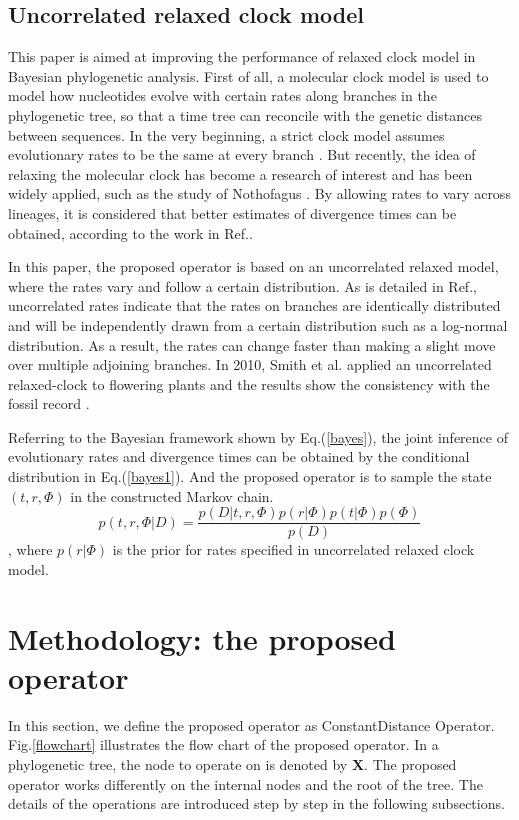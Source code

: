 \documentclass{bmcart}
\begin{document}
\subsection*{Uncorrelated relaxed clock model}
This paper is aimed at improving the performance of relaxed clock model in Bayesian phylogenetic analysis. First of all, a molecular clock model is used to model how nucleotides evolve with certain rates along branches in the phylogenetic tree, so that a time tree can reconcile with the genetic distances between sequences. In the very beginning, a strict clock model assumes evolutionary rates to be the same at every branch \cite{zuckerkandl1965evolutionary}. But recently, the idea of relaxing the molecular clock has become a research of interest and has been widely applied, such as the study of Nothofagus \cite{knapp2005relaxed}. By allowing rates to vary across lineages, it is considered that better estimates of divergence times can be obtained, according to the work in Ref.\cite{ho2005accuracy,renner2005relaxed,lepage2007general}. 

 In this paper, the proposed operator is based on an uncorrelated relaxed model, where the rates vary and follow a certain distribution. As is detailed in Ref.\cite{drummond2006relaxed}, uncorrelated rates indicate that the rates on branches are identically distributed and will be independently drawn from a certain distribution such as a log-normal distribution. As a result, the rates can change faster than making a slight move over multiple adjoining branches. In 2010, Smith et al. applied an uncorrelated relaxed-clock to flowering plants and the results show the consistency with the fossil record \cite{smith2010uncorrelated}.

Referring to the Bayesian framework shown by Eq.(\ref{bayes}), the joint inference of evolutionary rates and divergence times can be obtained by the conditional distribution in Eq.(\ref{bayes1}). And the proposed operator is to sample the state $(t,r,\Phi)$ in the constructed Markov chain.
\begin{equation}\label{bayes1}
p(t,r,\Phi |D) = \frac{{p(D|t,r,\Phi )p(r|\Phi )p(t|\Phi )p(\Phi )}}{{p(D)}}
\end{equation}
, where $p(r|\Phi )$ is the prior for rates specified in uncorrelated relaxed clock model.
\section*{Methodology: the proposed operator}
In this section, we define the proposed operator as ConstantDistance Operator. Fig.\ref{flowchart} illustrates the flow chart of the proposed operator. In a phylogenetic tree, the node to operate on is denoted by \textbf{X}. The proposed operator works differently on the internal nodes and the root of the tree. The details of the operations are introduced step by step in the following subsections.
\end{document}
